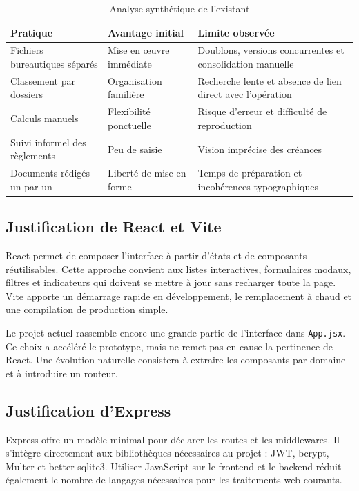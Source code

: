 \documentclass[12pt,a4paper,oneside]{report}
\newcommand{\code}[1]{\texttt{#1}}
\begin{document}
\begin{table}[H]\centering
\caption{Analyse synthétique de l'existant}
\begin{tabularx}{\textwidth}{Y Y Y}
\toprule \textbf{Pratique} & \textbf{Avantage initial} & \textbf{Limite observée}\\ \midrule
Fichiers bureautiques séparés & Mise en œuvre immédiate & Doublons, versions concurrentes et consolidation manuelle\\
Classement par dossiers & Organisation familière & Recherche lente et absence de lien direct avec l'opération\\
Calculs manuels & Flexibilité ponctuelle & Risque d'erreur et difficulté de reproduction\\
Suivi informel des règlements & Peu de saisie & Vision imprécise des créances\\
Documents rédigés un par un & Liberté de mise en forme & Temps de préparation et incohérences typographiques\\
\bottomrule
\end{tabularx}
\end{table}

\subsection{Justification de React et Vite}
React permet de composer l'interface à partir d'états et de composants réutilisables. Cette approche convient aux listes interactives, formulaires modaux, filtres et indicateurs qui doivent se mettre à jour sans recharger toute la page. Vite apporte un démarrage rapide en développement, le remplacement à chaud et une compilation de production simple.

Le projet actuel rassemble encore une grande partie de l'interface dans \code{App.jsx}. Ce choix a accéléré le prototype, mais ne remet pas en cause la pertinence de React. Une évolution naturelle consistera à extraire les composants par domaine et à introduire un routeur.

\subsection{Justification d'Express}
Express offre un modèle minimal pour déclarer les routes et les middlewares. Il s'intègre directement aux bibliothèques nécessaires au projet : JWT, bcrypt, Multer et better-sqlite3. Utiliser JavaScript sur le frontend et le backend réduit également le nombre de langages nécessaires pour les traitements web courants.
\end{document}
